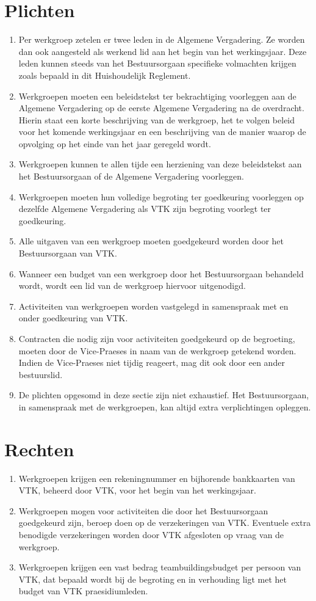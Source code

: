 \section{Plichten}
\begin{enumerate}
    \item Per werkgroep zetelen er twee leden in de Algemene Vergadering. Ze worden dan ook aangesteld als werkend lid aan het begin van het werkingsjaar. Deze leden kunnen steeds van het Bestuursorgaan specifieke volmachten krijgen zoals bepaald in dit Huishoudelijk Reglement. 
    \item Werkgroepen moeten een beleidstekst ter bekrachtiging voorleggen aan de Algemene Vergadering op de eerste Algemene Vergadering na de overdracht. Hierin staat een korte beschrijving van de werkgroep, het te volgen beleid voor het komende werkingsjaar en een beschrijving van de manier waarop de opvolging op het einde van het jaar geregeld wordt. 
    \item Werkgroepen kunnen te allen tijde een herziening van deze beleidstekst aan het Bestuursorgaan of de Algemene Vergadering voorleggen. 
    \item  Werkgroepen moeten hun volledige begroting ter goedkeuring voorleggen op dezelfde Algemene Vergadering als VTK zijn begroting voorlegt ter goedkeuring. 
    \item Alle uitgaven van een werkgroep moeten goedgekeurd worden door het Bestuursorgaan van VTK.
    \item Wanneer een budget van een werkgroep door het Bestuursorgaan behandeld wordt, wordt een lid van de werkgroep hiervoor uitgenodigd.
    \item Activiteiten van werkgroepen worden vastgelegd in samenspraak met en onder goedkeuring van VTK.
    \item Contracten die nodig zijn voor activiteiten goedgekeurd op de begroeting, moeten door de Vice-Praeses in naam van de werkgroep getekend worden. Indien de Vice-Praeses niet tijdig reageert, mag dit ook door een ander bestuurslid.
    \item De plichten opgesomd in deze sectie zijn niet exhaustief. Het Bestuursorgaan, in samenspraak met de werkgroepen, kan altijd extra verplichtingen opleggen.
\end{enumerate}

\section{Rechten}
\begin{enumerate}
    \item Werkgroepen krijgen een rekeningnummer en bijhorende bankkaarten van VTK, beheerd door VTK, voor het begin van het werkingsjaar. 
    \item Werkgroepen mogen voor activiteiten die door het Bestuursorgaan goedgekeurd zijn, beroep doen op de verzekeringen van VTK. Eventuele extra benodigde verzekeringen worden door VTK afgesloten op vraag van de werkgroep. 
    \item Werkgroepen krijgen een vast bedrag teambuildingsbudget per persoon van VTK, dat bepaald wordt bij de begroting en in verhouding ligt met het budget van VTK praesidiumleden.
\end{enumerate}

